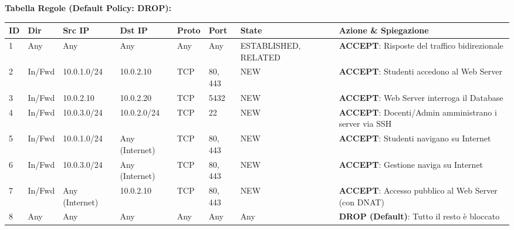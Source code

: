\documentclass[11pt,a4paper]{article}
\begin{document}
\begin{solutionbox}
\textbf{Tabella Regole (Default Policy: DROP):}
\begin{center}
\small
\begin{tabularx}{\textwidth}{lllllllX}
\toprule
\textbf{ID} & \textbf{Dir} & \textbf{Src IP} & \textbf{Dst IP} & \textbf{Proto} & \textbf{Port} & \textbf{State} & \textbf{Azione \& Spiegazione} \\
\midrule
1 & Any & Any & Any & Any & Any & ESTABLISHED, RELATED & \textbf{ACCEPT}: Risposte del traffico bidirezionale \\
2 & In/Fwd & 10.0.1.0/24 & 10.0.2.10 & TCP & 80, 443 & NEW & \textbf{ACCEPT}: Studenti accedono al Web Server \\
3 & In/Fwd & 10.0.2.10 & 10.0.2.20 & TCP & 5432 & NEW & \textbf{ACCEPT}: Web Server interroga il Database \\
4 & In/Fwd & 10.0.3.0/24 & 10.0.2.0/24 & TCP & 22 & NEW & \textbf{ACCEPT}: Docenti/Admin amministrano i server via SSH \\
5 & In/Fwd & 10.0.1.0/24 & Any (Internet) & TCP & 80, 443 & NEW & \textbf{ACCEPT}: Studenti navigano su Internet \\
6 & In/Fwd & 10.0.3.0/24 & Any (Internet) & TCP & 80, 443 & NEW & \textbf{ACCEPT}: Gestione naviga su Internet \\
7 & In/Fwd & Any (Internet) & 10.0.2.10 & TCP & 80, 443 & NEW & \textbf{ACCEPT}: Accesso pubblico al Web Server (con DNAT) \\
8 & Any & Any & Any & Any & Any & Any & \textbf{DROP (Default)}: Tutto il resto \`e bloccato \\
\bottomrule
\end{tabularx}
\end{center}
\end{solutionbox}
\end{document}

